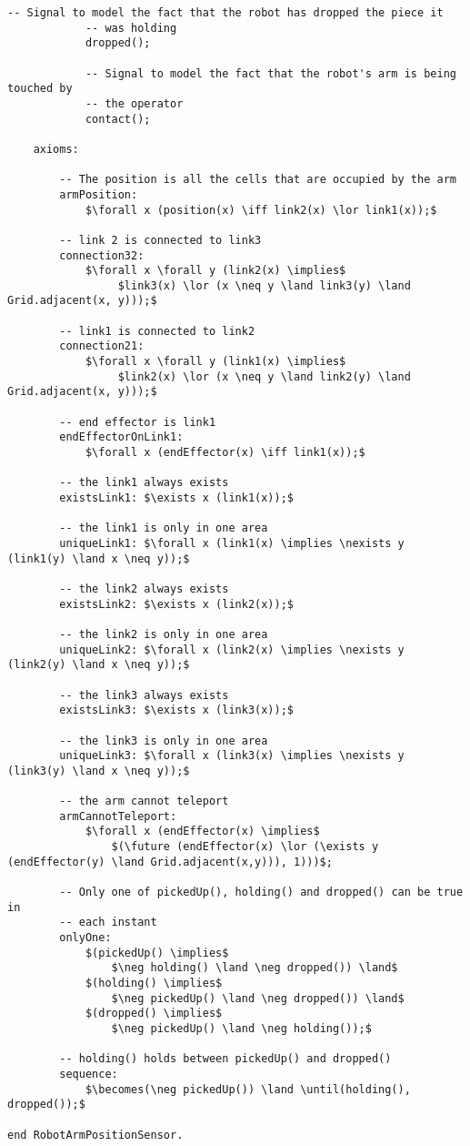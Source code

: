\begin{lstlisting}[fontadjust, mathescape, frame=single]
            -- Signal to model the fact that the robot has dropped the piece it
            -- was holding
            dropped();

            -- Signal to model the fact that the robot's arm is being touched by
            -- the operator
            contact();

    axioms:

        -- The position is all the cells that are occupied by the arm
        armPosition: 
            $\forall x (position(x) \iff link2(x) \lor link1(x));$
        
        -- link 2 is connected to link3
        connection32: 
            $\forall x \forall y (link2(x) \implies$
                 $link3(x) \lor (x \neq y \land link3(y) \land Grid.adjacent(x, y)));$

        -- link1 is connected to link2
        connection21: 
            $\forall x \forall y (link1(x) \implies$ 
                 $link2(x) \lor (x \neq y \land link2(y) \land Grid.adjacent(x, y)));$

        -- end effector is link1
        endEffectorOnLink1:
            $\forall x (endEffector(x) \iff link1(x));$

        -- the link1 always exists
        existsLink1: $\exists x (link1(x));$

        -- the link1 is only in one area
        uniqueLink1: $\forall x (link1(x) \implies \nexists y (link1(y) \land x \neq y));$
        
        -- the link2 always exists
        existsLink2: $\exists x (link2(x));$

        -- the link2 is only in one area
        uniqueLink2: $\forall x (link2(x) \implies \nexists y (link2(y) \land x \neq y));$

        -- the link3 always exists
        existsLink3: $\exists x (link3(x));$

        -- the link3 is only in one area
        uniqueLink3: $\forall x (link3(x) \implies \nexists y (link3(y) \land x \neq y));$    

        -- the arm cannot teleport
        armCannotTeleport:
            $\forall x (endEffector(x) \implies$ 
                $(\future (endEffector(x) \lor (\exists y (endEffector(y) \land Grid.adjacent(x,y))), 1)))$;

        -- Only one of pickedUp(), holding() and dropped() can be true in 
        -- each instant
        onlyOne:
            $(pickedUp() \implies$
                $\neg holding() \land \neg dropped()) \land$
            $(holding() \implies$ 
                $\neg pickedUp() \land \neg dropped()) \land$
            $(dropped() \implies$
                $\neg pickedUp() \land \neg holding());$

        -- holding() holds between pickedUp() and dropped()
        sequence:
            $\becomes(\neg pickedUp()) \land \until(holding(), dropped());$

end RobotArmPositionSensor.
\end{lstlisting}